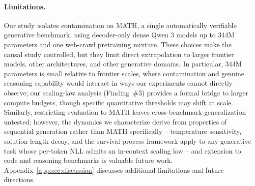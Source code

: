 \paragraph{Limitations.}
Our study isolates contamination on MATH, a single automatically verifiable generative benchmark, using decoder-only dense Qwen 3 models up to 344M parameters and one web-crawl pretraining mixture.
These choices make the causal study controlled, but they limit direct extrapolation to larger frontier models, other architectures, and other generative domains.
In particular, 344M parameters is small relative to frontier scales, where contamination and genuine reasoning capability would interact in ways our experiments cannot directly observe; our scaling-law analysis (Finding~\#3) provides a formal bridge to larger compute budgets, though specific quantitative thresholds may shift at scale.
Similarly, restricting evaluation to MATH leaves cross-benchmark generalization untested; however, the dynamics we characterize derive from properties of sequential generation rather than MATH specifically -- temperature sensitivity, solution-length decay, and the survival-process framework apply to any generative task whose per-token NLL admits an in-context scaling law -- and extension to code and reasoning benchmarks is valuable future work.
Appendix~\ref{app:sec:discussion} discusses additional limitations and future directions.
